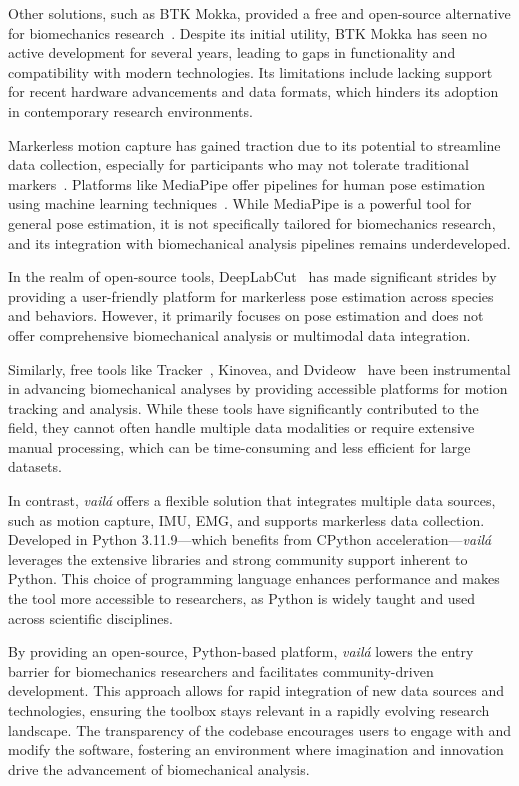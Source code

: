 \documentclass{article}
\begin{document}
Other solutions, such as BTK Mokka, provided a free and open-source alternative for biomechanics research~\citep{Barre2014}. Despite its initial utility, BTK Mokka has seen no active development for several years, leading to gaps in functionality and compatibility with modern technologies. Its limitations include lacking support for recent hardware advancements and data formats, which hinders its adoption in contemporary research environments.

Markerless motion capture has gained traction due to its potential to streamline data collection, especially for participants who may not tolerate traditional markers~\citep{Smith2023}. Platforms like MediaPipe offer pipelines for human pose estimation using machine learning techniques~\citep{lugaresi2019mediapipe}. While MediaPipe is a powerful tool for general pose estimation, it is not specifically tailored for biomechanics research, and its integration with biomechanical analysis pipelines remains underdeveloped.

In the realm of open-source tools, DeepLabCut~\citep{Matthis2022} has made significant strides by providing a user-friendly platform for markerless pose estimation across species and behaviors. However, it primarily focuses on pose estimation and does not offer comprehensive biomechanical analysis or multimodal data integration.

Similarly, free tools like Tracker~\citep{wee2013open}, Kinovea, and Dvideow~\citep{figueroa2003flexible} have been instrumental in advancing biomechanical analyses by providing accessible platforms for motion tracking and analysis. While these tools have significantly contributed to the field, they cannot often handle multiple data modalities or require extensive manual processing, which can be time-consuming and less efficient for large datasets.

In contrast, \textit{vailá} offers a flexible solution that integrates multiple data sources, such as motion capture, IMU, EMG, and supports markerless data collection. Developed in Python 3.11.9—which benefits from CPython acceleration—\textit{vailá} leverages the extensive libraries and strong community support inherent to Python. This choice of programming language enhances performance and makes the tool more accessible to researchers, as Python is widely taught and used across scientific disciplines.

By providing an open-source, Python-based platform, \textit{vailá} lowers the entry barrier for biomechanics researchers and facilitates community-driven development. This approach allows for rapid integration of new data sources and technologies, ensuring the toolbox stays relevant in a rapidly evolving research landscape. The transparency of the codebase encourages users to engage with and modify the software, fostering an environment where imagination and innovation drive the advancement of biomechanical analysis.
\end{document}
